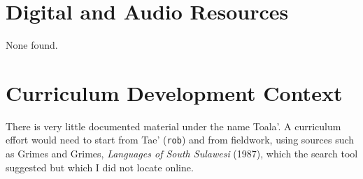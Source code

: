 \documentclass[12pt]{article}
\begin{document}
\section{Digital and Audio Resources}
None found.

\section{Curriculum Development Context}
There is very little documented material under the name Toala'. A curriculum effort would need to start from Tae' (\texttt{rob}) and from fieldwork, using sources such as Grimes and Grimes, \emph{Languages of South Sulawesi} (1987), which the search tool suggested but which I did not locate online.
\end{document}
